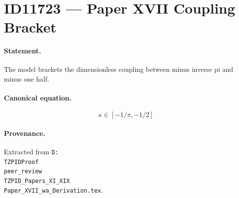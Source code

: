 \section*{ID11723 --- Paper XVII Coupling Bracket}

\paragraph{Statement.}
The model brackets the dimensionless coupling between minus inverse pi and minus one half.

\paragraph{Canonical equation.}
\[
\kappa\in[-1/\pi,-1/2]
\]

\paragraph{Provenance.}
Extracted from \texttt{D:\\TZPIDProof\\peer\_review\\TZPID\_Papers\_XI\_XIX\\Paper\_XVII\_wa\_Derivation.tex}.
